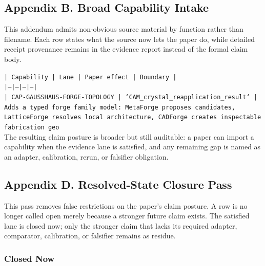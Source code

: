 \documentclass[11pt]{article}
\begin{document}
\subsection*{Appendix B. Broad Capability Intake}

This addendum admits non-obvious source material by function rather than filename. Each row states what the source now lets the paper do, while detailed receipt provenance remains in the evidence report instead of the formal claim body.

\noindent\texttt{| Capability | Lane | Paper effect | Boundary |}\\
\noindent\texttt{|---|---|---|---|}\\
\noindent\texttt{| CAP-GAUSSHAUS-FORGE-TOPOLOGY | `CAM\_crystal\_reapplication\_result` | Adds a typed forge family model: MetaForge proposes candidates, LatticeForge resolves local architecture, CADForge creates inspectable fabrication geo}\\

The resulting claim posture is broader but still auditable: a paper can import a capability when the evidence lane is satisfied, and any remaining gap is named as an adapter, calibration, rerun, or falsifier obligation.

\subsection*{Appendix D. Resolved-State Closure Pass}

This pass removes false restrictions on the paper's claim posture. A row is no longer called open merely because a stronger future claim exists. The satisfied lane is closed now; only the stronger claim that lacks its required adapter, comparator, calibration, or falsifier remains as residue.

\subsubsection*{Closed Now}
\end{document}
